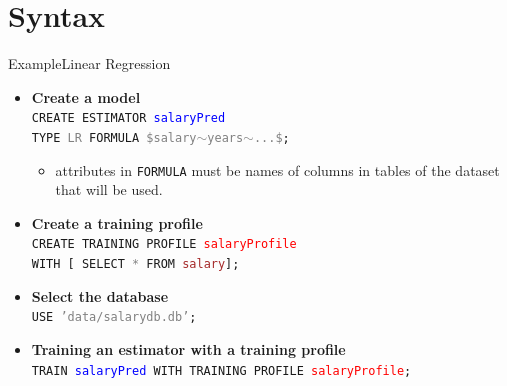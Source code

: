 \documentclass[handout, xcolor={dvipsnames}]{beamer}
\begin{document}
\section{Syntax}
\begin{frame}{Example}{Linear Regression}
  \begin{itemize}
  \item<1-> {
   \textbf{Create a model}
   \\
  }
  \texttt{CREATE ESTIMATOR \textcolor{blue}{salaryPred} \\ TYPE \textcolor{Gray}{LR} FORMULA
  \textcolor{Gray}{\$salary$\sim$years$\sim$...\$}; }
  \begin{itemize}
      \item attributes in \texttt{FORMULA} must be names of columns in tables of the dataset that will be used.
  \end{itemize}
  \vspace{.1in}
  \item<2->{
  \textbf{Create a training profile}
  \\
  \texttt{CREATE TRAINING PROFILE \textcolor{red}{salaryProfile} \\ 
  WITH [ SELECT \textcolor{Gray}{*} FROM \textcolor{brown}{salary}];}
  }
  \vspace{.1in}
  \item<3->{
  \textbf{Select the database}
  \\
  \texttt{USE \textcolor{Gray}{'data/salarydb.db'};}
  }  
  \vspace{.1in}
  \item<4->{
 \textbf{ Training an estimator with a training profile}
  \\
  \texttt{TRAIN \textcolor{blue}{salaryPred} WITH TRAINING PROFILE \textcolor{red}{salaryProfile};
  }
  
  }
  \end{itemize}
\end{frame}
\end{document}
